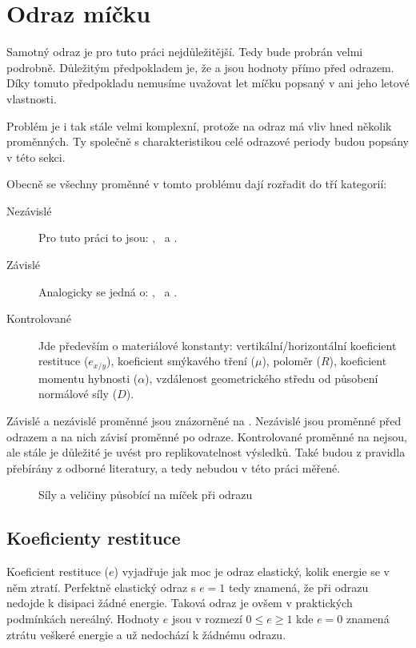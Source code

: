 \section{Odraz míčku}
\label{sec:odraz-micku}

Samotný odraz je pro tuto práci nejdůležitější. Tedy bude probrán velmi
podrobně. Důležitým předpokladem je, že  a  jsou hodnoty přímo
před odrazem. Díky tomuto předpokladu nemusíme uvažovat let míčku
popsaný v  ani jeho letové vlastnosti.

Problém je i tak stále velmi komplexní, protože na odraz má vliv hned několik
proměnných. Ty společně s charakteristikou celé odrazové periody budou popsány v
této sekci.

Obecně se všechny proměnné v tomto problému dají rozřadit do tří kategorií:

\begin{description}
 \item[Nezávislé] Pro tuto práci to jsou: ,~ a .
 \item[Závislé] Analogicky se jedná o: ,~ a .
 \item[Kontrolované] Jde především o materiálové konstanty:
  vertikální/horizontální koeficient restituce ($e_{x/y}$), koeficient smýkavého
 tření ($\mu$), poloměr ($R$), koeficient momentu hybnosti ($\alpha$),
 vzdálenost geometrického středu od působení normálové síly ($D$).
\end{description}

Závislé a nezávislé proměnné jsou znázorněné na .
Nezávislé jsou proměnné před odrazem a na nich závisí proměnné po odraze.
Kontrolované proměnné na  nejsou, ale stále je
důležité je uvést pro replikovatelnost výsledků. Také budou z pravidla přebírány
z odborné literatury, a tedy nebudou v této práci měřené.

\begin{figure}[htbp]
 \centering
 

 \caption{Síly a veličiny působící na míček při odrazu}
 \label{fig:odraz-micku}
\end{figure}

\subsection{Koeficienty restituce}
\label{ssec:koeficienty-restituce}
Koeficient restituce ($e$) vyjadřuje jak moc je odraz elastický, kolik energie
se v něm ztratí. Perfektně elastický odraz s $e=1$ tedy znamená, že při odrazu
nedojde k disipaci žádné energie. Taková odraz je ovšem v praktických podmínkách
nereálný. Hodnoty $e$ jsou v rozmezí $0 \leq e \geq 1$ kde $e=0$ znamená ztrátu
veškeré energie a už nedochází k žádnému odrazu.
\autocite{ahmadImpactModelsCoefficient2016,CoefficientRestitutionFormula}

